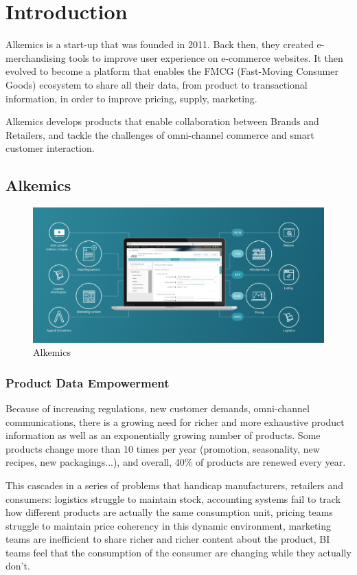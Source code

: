\chapter{Introduction}

Alkemics is a start-up that was founded in 2011. Back then, they created e-merchandising tools to improve user experience on e-commerce websites. It then evolved to become a platform that enables the FMCG (Fast-Moving Consumer Goods) ecosystem to share all their data, from product to transactional information, in order to improve pricing, supply, marketing.

Alkemics develops products that enable collaboration between Brands and Retailers, and tackle the challenges of omni-channel commerce and smart customer interaction.

\section{Alkemics}

\begin{figure}[H]
\centering
\includegraphics[scale=0.30]{./images/alkemics_website_global.png}
\caption{Alkemics}
\end{figure}

\subsection{Product Data Empowerment}

Because of increasing regulations, new customer demands, omni-channel communications, there is a growing need for richer and more exhaustive product information as well as an exponentially growing number of products. Some products change more than 10 times per year (promotion, seasonality, new recipes, new packagings...), and overall, 40\% of products are renewed every year.

This cascades in a series of problems that handicap manufacturers, retailers and consumers: logistics struggle to maintain stock, accounting systems fail to track how different products are actually the same consumption unit, pricing teams struggle to maintain price coherency in this dynamic environment, marketing teams are inefficient to share richer and richer content about the product, BI teams feel that the consumption of the consumer are changing while they actually don't.

